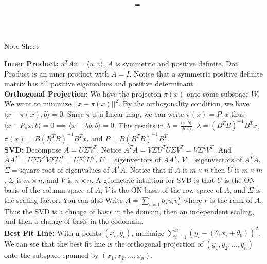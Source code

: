 \documentclass[answers,12pt,addpoints]{exam}
\author{\name}
\title{\course \ - \assignment}
\begin{document}
\maketitle
\newpage
\begin{center}
    Note Sheet
\end{center}

\textbf{Inner Product:} $u^T A v = \langle u, v \rangle$. $A$ is symmetric and positive definite. Dot Product is an inner product with $A = I$. Notice that a symmetric positive definite matrix has all positive eigenvalues and positive determinant.\\

\textbf{Orthogonal Projection:} We have the projecton $\pi(x)$ onto some subspace $W$. We want to minimize $||x - \pi(x)||^2$. By the orthogonality condition, we have $\langle x - \pi(x), b \rangle = 0$. Since $\pi$ is a linear map, we can write $\pi(x) = P_{\pi}x$ thus $\langle x - P_{\pi}x, b \rangle = 0 \implies \langle x - \lambda b, b \rangle = 0$. This results in $\lambda = \frac{\langle x, b \rangle}{\langle b, b \rangle}$. $\lambda = (B^T B)^{-1}B^T x$, $\pi(x) = B(B^T B)^{-1}B^T x$. and $P = B(B^T B)^{-1}B^T$.\\

\textbf{SVD:} Decompose $A = U\Sigma V^T$. Notice $A^TA = V\Sigma U^T U \Sigma V^T = V\Sigma^2V^T$. And $AA^T = U\Sigma V^T V \Sigma U^T = U \Sigma^2 U^T$. $U = \text{eigenvectors of } AA^T$. $V = \text{eigenvectors of } A^TA$. $\Sigma = \text{square root of eigenvalues of } A^TA$. Notice that if $A$ is $m \times n$ then $U$ is $m \times m$, $\Sigma$ is $m \times n$, and $V$ is $n \times n$. A geometric intuition for SVD is that $U$ is the ON basis of the column space of $A$, $V$ is the ON basis of the row space of $A$, and $\Sigma$ is the scaling factor. You can also Write $A = \sum_{i=1}^r \sigma_i u_i v_i^T$ where $r$ is the rank of $A$. Thus the SVD is a chnage of basis in the domain, then an independent scaling, and then a change of basis in the codomain.\\

\textbf{Best Fit Line:} With n points $(x_i, y_i)$, minimize $\sum_{i=1}^n (y_i - ( \theta_1 x_i + \theta_0))^2$. We can see that the best fit line is the orthogonal projection of $(y_1, y_2, \ldots, y_n)$ onto the subspace spanned by $(x_1, x_2, \ldots, x_n)$.\\
\end{document}
